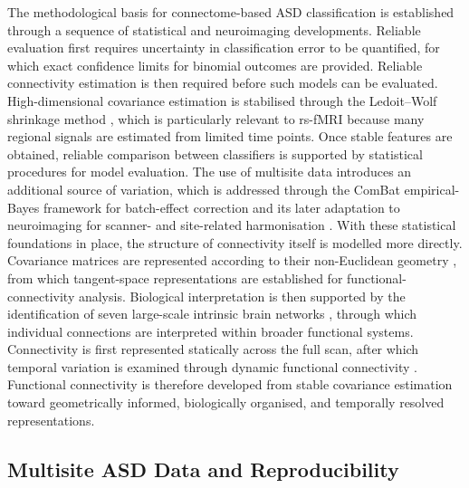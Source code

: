 The methodological basis for connectome-based ASD classification is established through a sequence of statistical and neuroimaging developments. Reliable evaluation first requires uncertainty in classification error to be quantified, for which exact confidence limits for binomial outcomes are provided. Reliable connectivity estimation is then required before such models can be evaluated. High-dimensional covariance estimation is stabilised through the Ledoit--Wolf shrinkage method \citep{LedoitWolf2004}, which is particularly relevant to rs-fMRI because many regional signals are estimated from limited time points. Once stable features are obtained, reliable comparison between classifiers is supported by statistical procedures for model evaluation. The use of multisite data introduces an additional source of variation, which is addressed through the ComBat empirical-Bayes framework for batch-effect correction \citep{Johnsonetal2007} and its later adaptation to neuroimaging for scanner- and site-related harmonisation \citep{Fortinetal2018}. With these statistical foundations in place, the structure of connectivity itself is modelled more directly. Covariance matrices are represented according to their non-Euclidean geometry \citep{Varoquauxetal2010}, from which tangent-space representations are established for functional-connectivity analysis. Biological interpretation is then supported by the identification of seven large-scale intrinsic brain networks \citep{Yeoetal2011}, through which individual connections are interpreted within broader functional systems. Connectivity is first represented statically across the full scan, after which temporal variation is examined through dynamic functional connectivity \citep{Hutchisonetal2013}. Functional connectivity is therefore developed from stable covariance estimation toward geometrically informed, biologically organised, and temporally resolved representations.

\subsection{Multisite ASD Data and Reproducibility}

